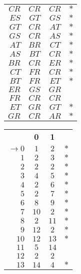 \documentclass[a4paper,11pt]{article}
\begin{document}
\begin{enumerate}
\begin{center}
\begin{tabular}{r|c|c|l}
				$CR$	 & $CR$ & $CR$ & $\ast$ \\ \cline{2-3}
				$ES$	 & $GT$ & $GS$ & $\ast$ \\ \cline{2-3}
				$GT$	 & $CR$ & $AT$ & $\ast$ \\ \cline{2-3}
				$GS$	 & $CR$ & $AS$ & $\ast$ \\ \cline{2-3}
				$AT$	 & $BR$ & $CT$ & $\ast$ \\ \cline{2-3}
				$AS$	 & $BT$ & $CR$ & $\ast$ \\ \cline{2-3}
				$BR$	 & $CR$ & $ER$ & $\ast$ \\ \cline{2-3}
				$CT$	 & $FR$ & $CR$ & $\ast$ \\ \cline{2-3}
				$BT$	 & $FR$ & $ET$ & $\ast$ \\ \cline{2-3}
				$ER$	 & $GS$ & $GR$ &  \\ \cline{2-3}
				$FR$	 & $CR$ & $CR$ &  \\ \cline{2-3}
				$ET$	 & $GR$ & $GT$ & $\ast$ \\ \cline{2-3}
				$GR$	 & $CR$ & $AR$ & $\ast$ \\ \cline{2-3}
			\end{tabular}
			\qquad
			\begin{tabular}{r|c|c|l}
				\cline{2-3}
				& {\bf 0}& {\bf 1} & \\ \cline{2-3}
				$\to 0$& $1$  & $2$  & $\ast$ \\ \cline{2-3}
				$1$	   & $2$  & $3$  & $\ast$ \\ \cline{2-3}
				$2$	   & $2$  & $2$  & $\ast$ \\ \cline{2-3}
				$3$	   & $4$  & $5$  & $\ast$ \\ \cline{2-3}
				$4$	   & $2$  & $6$  & $\ast$ \\ \cline{2-3}
				$5$	   & $2$  & $7$  & $\ast$ \\ \cline{2-3}
				$6$	   & $8$  & $9$  & $\ast$ \\ \cline{2-3}
				$7$	   & $10$ & $2$  & $\ast$ \\ \cline{2-3}
				$8$	   & $2$  & $11$ & $\ast$ \\ \cline{2-3}
				$9$	   & $12$ & $2$  & $\ast$ \\ \cline{2-3}
				$10$   & $12$ & $13$ & $\ast$ \\ \cline{2-3}
				$11$   & $5$  & $14$ &        \\ \cline{2-3}
				$12$   & $2$  & $2$  &        \\ \cline{2-3}
				$13$   & $14$ & $4$  & $\ast$ \\ \cline{2-3}

\end{tabular}
\end{center}
\end{enumerate}
\end{document}
